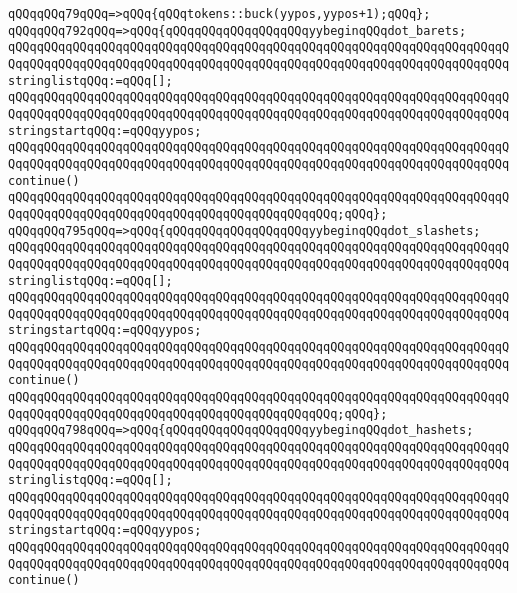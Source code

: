 \verb|qQQqqQQq79qQQq=>qQQq{qQQqtokens::buck(yypos,yypos+1);qQQq};|\newline
\verb|qQQqqQQq792qQQq=>qQQq{qQQqqQQqqQQqqQQqqQQqyybeginqQQqdot_barets;|\newline
\verb|qQQqqQQqqQQqqQQqqQQqqQQqqQQqqQQqqQQqqQQqqQQqqQQqqQQqqQQqqQQqqQQqqQQqqQQqqQQqqQQqqQQqqQQqqQQqqQQqqQQqqQQqqQQqqQQqqQQqqQQqqQQqqQQqqQQqqQQqqQQqstringlistqQQq:=qQQq[];|\newline
\verb|qQQqqQQqqQQqqQQqqQQqqQQqqQQqqQQqqQQqqQQqqQQqqQQqqQQqqQQqqQQqqQQqqQQqqQQqqQQqqQQqqQQqqQQqqQQqqQQqqQQqqQQqqQQqqQQqqQQqqQQqqQQqqQQqqQQqqQQqqQQqstringstartqQQq:=qQQqyypos;|\newline
\verb|qQQqqQQqqQQqqQQqqQQqqQQqqQQqqQQqqQQqqQQqqQQqqQQqqQQqqQQqqQQqqQQqqQQqqQQqqQQqqQQqqQQqqQQqqQQqqQQqqQQqqQQqqQQqqQQqqQQqqQQqqQQqqQQqqQQqqQQqqQQqcontinue()|\newline
\verb|qQQqqQQqqQQqqQQqqQQqqQQqqQQqqQQqqQQqqQQqqQQqqQQqqQQqqQQqqQQqqQQqqQQqqQQqqQQqqQQqqQQqqQQqqQQqqQQqqQQqqQQqqQQqqQQqqQQq;qQQq};|\newline
\verb|qQQqqQQq795qQQq=>qQQq{qQQqqQQqqQQqqQQqqQQqyybeginqQQqdot_slashets;|\newline
\verb|qQQqqQQqqQQqqQQqqQQqqQQqqQQqqQQqqQQqqQQqqQQqqQQqqQQqqQQqqQQqqQQqqQQqqQQqqQQqqQQqqQQqqQQqqQQqqQQqqQQqqQQqqQQqqQQqqQQqqQQqqQQqqQQqqQQqqQQqqQQqstringlistqQQq:=qQQq[];|\newline
\verb|qQQqqQQqqQQqqQQqqQQqqQQqqQQqqQQqqQQqqQQqqQQqqQQqqQQqqQQqqQQqqQQqqQQqqQQqqQQqqQQqqQQqqQQqqQQqqQQqqQQqqQQqqQQqqQQqqQQqqQQqqQQqqQQqqQQqqQQqqQQqstringstartqQQq:=qQQqyypos;|\newline
\verb|qQQqqQQqqQQqqQQqqQQqqQQqqQQqqQQqqQQqqQQqqQQqqQQqqQQqqQQqqQQqqQQqqQQqqQQqqQQqqQQqqQQqqQQqqQQqqQQqqQQqqQQqqQQqqQQqqQQqqQQqqQQqqQQqqQQqqQQqqQQqcontinue()|\newline
\verb|qQQqqQQqqQQqqQQqqQQqqQQqqQQqqQQqqQQqqQQqqQQqqQQqqQQqqQQqqQQqqQQqqQQqqQQqqQQqqQQqqQQqqQQqqQQqqQQqqQQqqQQqqQQqqQQqqQQq;qQQq};|\newline
\verb|qQQqqQQq798qQQq=>qQQq{qQQqqQQqqQQqqQQqqQQqyybeginqQQqdot_hashets;|\newline
\verb|qQQqqQQqqQQqqQQqqQQqqQQqqQQqqQQqqQQqqQQqqQQqqQQqqQQqqQQqqQQqqQQqqQQqqQQqqQQqqQQqqQQqqQQqqQQqqQQqqQQqqQQqqQQqqQQqqQQqqQQqqQQqqQQqqQQqqQQqqQQqstringlistqQQq:=qQQq[];|\newline
\verb|qQQqqQQqqQQqqQQqqQQqqQQqqQQqqQQqqQQqqQQqqQQqqQQqqQQqqQQqqQQqqQQqqQQqqQQqqQQqqQQqqQQqqQQqqQQqqQQqqQQqqQQqqQQqqQQqqQQqqQQqqQQqqQQqqQQqqQQqqQQqstringstartqQQq:=qQQqyypos;|\newline
\verb|qQQqqQQqqQQqqQQqqQQqqQQqqQQqqQQqqQQqqQQqqQQqqQQqqQQqqQQqqQQqqQQqqQQqqQQqqQQqqQQqqQQqqQQqqQQqqQQqqQQqqQQqqQQqqQQqqQQqqQQqqQQqqQQqqQQqqQQqqQQqcontinue()|\newline
